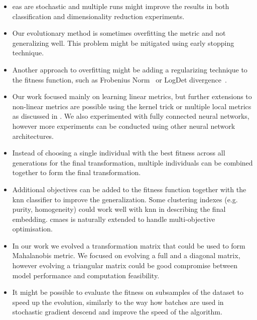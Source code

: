 \documentclass[12pt,a4paper]{report}
\begin{document}
\begin{itemize}
\item \Aclp{ea} are stochastic and multiple runs might improve the results in both classification and dimensionality reduction experiments.

\item Our evolutionary method is sometimes overfitting the metric and not generalizing well. This problem might be mitigated using early stopping technique.

\item Another approach to overfitting might be adding a regularizing technique to the fitness function, such as Frobenius Norm~\citep{schultz2003learning} or LogDet divergence~\citep{davis2007information}.

\item Our work focused mainly on learning linear metrics, but further extensions to non-linear metrics are possible using the kernel trick \citep{chatpatanasiri2010new} or multiple local metrics as discussed in \citep{bellet2013survey}. We also experimented with fully connected neural networks, however more experiments can be conducted using other neural network architectures.

\item Instead of choosing a single individual with the best fitness across all generations for the final transformation, multiple individuals can be combined together to form the final transformation.

\item Additional objectives can be added to the fitness function together with the \ac{knn} classifier to improve the generalization.  Some clustering indexes (e.g. purity, homogeneity) could work well with \ac{knn} in describing the final embedding. \ac{cmaes} is naturally extended to handle multi-objective optimisation.

\item In our work we evolved a transformation matrix that could be used to form Mahalanobis metric. We focused on evolving a full and a diagonal matrix, however evolving a triangular matrix could be good compromise between model performance and computation feasibility.

\item It might be possible to evaluate the fitness on subsamples of the dataset to speed up the evolution, similarly to the way how batches are used in stochastic gradient descend and improve the speed of the algorithm.
\end{itemize}
\end{document}
